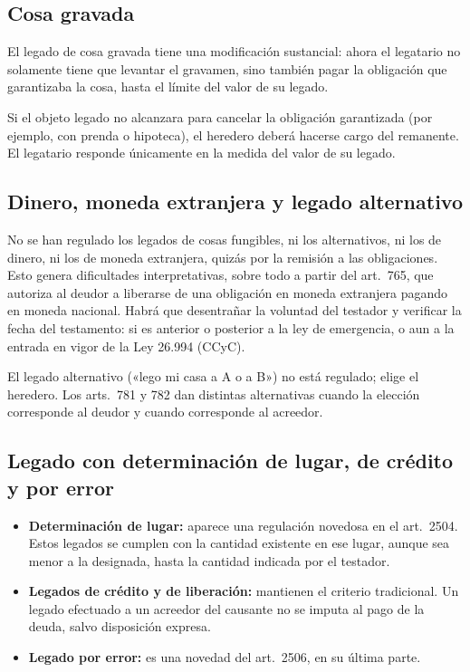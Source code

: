 \documentclass[12pt,oneside]{book}
\begin{document}
\subsection{Cosa gravada}

\begin{important}
El legado de cosa gravada tiene una modificación sustancial: ahora el legatario no solamente tiene que levantar el gravamen, sino también pagar la obligación que garantizaba la cosa, hasta el límite del valor de su legado.
\end{important}

Si el objeto legado no alcanzara para cancelar la obligación garantizada (por ejemplo, con prenda o hipoteca), el heredero deberá hacerse cargo del remanente. El legatario responde únicamente en la medida del valor de su legado.

\subsection{Dinero, moneda extranjera y legado alternativo}

No se han regulado los legados de cosas fungibles, ni los alternativos, ni los de dinero, ni los de moneda extranjera, quizás por la remisión a las obligaciones. Esto genera dificultades interpretativas, sobre todo a partir del art.~765, que autoriza al deudor a liberarse de una obligación en moneda extranjera pagando en moneda nacional. Habrá que desentrañar la voluntad del testador y verificar la fecha del testamento: si es anterior o posterior a la ley de emergencia, o aun a la entrada en vigor de la Ley 26.994 (CCyC).

El legado alternativo («lego mi casa a A o a B») no está regulado; elige el heredero. Los arts.~781 y 782 dan distintas alternativas cuando la elección corresponde al deudor y cuando corresponde al acreedor.

\subsection{Legado con determinación de lugar, de crédito y por error}

\begin{itemize}
    \item \textbf{Determinación de lugar:} aparece una regulación novedosa en el art.~2504. Estos legados se cumplen con la cantidad existente en ese lugar, aunque sea menor a la designada, hasta la cantidad indicada por el testador.
    \item \textbf{Legados de crédito y de liberación:} mantienen el criterio tradicional. Un legado efectuado a un acreedor del causante no se imputa al pago de la deuda, salvo disposición expresa.
    \item \textbf{Legado por error:} es una novedad del art.~2506, en su última parte.
\end{itemize}
\end{document}
